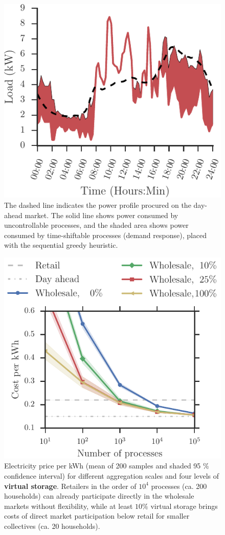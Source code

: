 \documentclass[conference]{IEEEtran}
\begin{document}
\begin{figure}[b]
\centering
\vspace{6.4mm}\includegraphics[scale=0.9]{figures/movable.pdf}
\caption{The dashed line indicates the power profile procured on the day-ahead market. The solid line shows power consumed by uncontrollable processes, and the shaded area shows power consumed by time-shiftable processes (demand response), placed with the sequential greedy heuristic.}
\label{fig:movable}
\end{figure}

\begin{figure}[!t]
\centering
\includegraphics[width=0.9\columnwidth]{figures/Wholesale.pdf}
\caption{Electricity price per kWh (mean of 200 samples and shaded 95 \% confidence interval) for different aggregation scales and four levels of \textbf{virtual storage}. Retailers in the order of $10^4$ processes (ca. 200 households) can already participate directly in the wholesale markets without flexibility, while at least $10 \%$ virtual storage brings costs of direct market participation below retail for smaller collectives (ca. 20 households).}
\label{fig:wholesale}
\end{figure}
\end{document}
